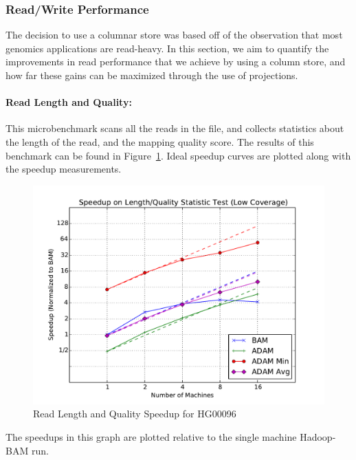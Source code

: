 \documentclass[10pt,twocolumn]{article}
\theoremstyle{plain}
\begin{document}
\subsubsection{Read/Write Performance}
\label{sec:read-write-performance}

The decision to use a columnar store was based off of the observation that most genomics applications are read-heavy. In this section,
we aim to quantify the improvements in read performance that we achieve by using a column store, and how far these gains can be
maximized through the use of projections.

\paragraph{Read Length and Quality:}
\label{sec:read-length-and-quality}

This microbenchmark scans all the reads in the file, and collects statistics about the length of the read, and the mapping quality score.
The results of this benchmark can be found in Figure~\ref{fig:length-quality}. Ideal speedup curves are plotted along with the speedup measurements.

\begin{figure}[h]
\begin{center}
\includegraphics[width=\linewidth]{microbenchmarks/length_and_quality_low_coverage.pdf}
\end{center}
\caption{Read Length and Quality Speedup for HG00096}
\label{fig:length-quality}
\end{figure}

The speedups in this graph are plotted relative to the single machine Hadoop-BAM run.
\end{document}
